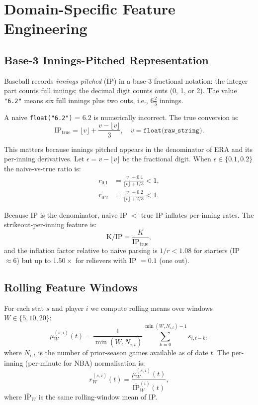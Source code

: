 \documentclass[conference]{IEEEtran}
\begin{document}
\section{Domain-Specific Feature Engineering}
\label{sec:features}

\subsection{Base-3 Innings-Pitched Representation}

Baseball records \emph{innings pitched} (IP) in a base-3 fractional
notation: the integer part counts full innings; the decimal digit counts
outs (0, 1, or 2).  The value \texttt{"6.2"} means six full innings
plus two outs, i.e., $6\tfrac{2}{3}$ innings.

A naive \texttt{float("6.2")} = 6.2 is numerically incorrect.  The
true conversion is:
\begin{equation}
  \text{IP}_{\text{true}}
    = \lfloor v \rfloor + \frac{v - \lfloor v \rfloor}{3},
    \quad v = \texttt{float(raw\_string)}.
\label{eq:ip}
\end{equation}

This matters because innings pitched appears in the denominator of
ERA and its per-inning derivatives.  Let $\epsilon = v - \lfloor v \rfloor$
be the fractional digit.  When $\epsilon \in \{0.1, 0.2\}$ the
naive-vs-true ratio is:
\begin{align}
  r_{0.1} &= \frac{\lfloor v\rfloor + 0.1}{\lfloor v\rfloor + 1/3} < 1,\\
  r_{0.2} &= \frac{\lfloor v\rfloor + 0.2}{\lfloor v\rfloor + 2/3} < 1.
\end{align}

Because IP is the denominator, naive IP $<$ true IP inflates per-inning
rates.  The strikeout-per-inning feature is:
\begin{equation}
  \text{K/IP} = \frac{K}{\text{IP}_{\text{true}}},
\label{eq:kip}
\end{equation}
and the inflation factor relative to naive parsing is $1/r < 1.08$
for starters (IP $\approx 6$) but up to $1.50\times$ for relievers
with IP $= 0.1$ (one out).

\subsection{Rolling Feature Windows}

For each stat $s$ and player $i$ we compute rolling means over windows
$W \in \{5, 10, 20\}$:
\begin{equation}
  \mu_W^{(s,i)}(t)
    = \frac{1}{\min(W,N_{i,t})}
      \sum_{k=0}^{\min(W,N_{i,t})-1} s_{i,t-k},
\label{eq:rolling}
\end{equation}
where $N_{i,t}$ is the number of prior-season games available as of
date $t$.  The per-inning (per-minute for NBA) normalisation is:
\begin{equation}
  r_W^{(s,i)}(t)
    = \frac{\mu_W^{(s,i)}(t)}{\bar{\text{IP}}_W^{(i)}(t)},
\label{eq:permin}
\end{equation}
where $\bar{\text{IP}}_W$ is the same rolling-window mean of IP.
\end{document}
